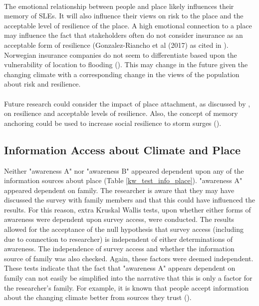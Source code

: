 \paragraph{}

The emotional relationship between people and place likely influences their memory of SLEs. It will also influence their views on risk to the place and the acceptable level of resilience of the place. A high emotional connection to a place may influence the fact that stakeholders often do not consider insurance as an acceptable form of resilience (Gonzalez-Riancho et al (2017) as cited in \cite{gerkensmeier_governing_2018}). Norwegian insurance companies do not seem to differentiate based upon the vulnerability of location to flooding (\cite{lujala_role_2020}). This may change in the future given the changing climate with a corresponding change in the views of the population about risk and resilience.
\paragraph{}
Future research could consider the impact of place attachment, as discussed by \cite{ariccio_place_2021}, on resilience and acceptable levels of resilience. Also, the concept of memory anchoring could be used to increase social resilience to storm surges (\cite{de_guttry_expiry_2022}).  


\subsection{Information Access about Climate and Place}\label{discuss-info-access}
Neither "awareness A" nor "awareness B" appeared dependent upon any of the information sources about place  (Table \ref{kw_test_info_place}). "awareness A" appeared dependent on family. The researcher is aware that they may have discussed the survey with family members and that this could have influenced the results. For this reason, extra Kruskal Wallis tests, upon whether either forms of awareness were dependent upon survey access, were conducted. The results allowed for the acceptance of the null hypothesis that survey access (including due to connection to researcher) is independent of either determinations of awareness. The independence of survey access and whether the information source of family was also checked. Again, these factors were deemed independent. These tests indicate that the fact that "awareness A" appears dependent on family can not easily be simplified into the narrative that this is only a factor for the researcher's family. For example, it is known that people accept information about the changing climate better from sources they trust (\cite{corner_a_principles_2018}). 
